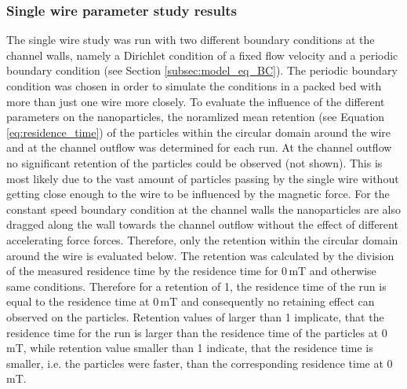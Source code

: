 \subsubsection{Single wire parameter study results}
\label{subsubsec:One_wire}

The single wire study was run with two different boundary conditions at the channel walls, namely a Dirichlet condition of a fixed flow velocity and a periodic boundary condition (see Section \ref{subsec:model_eq_BC}). The periodic boundary condition was chosen in order to simulate the conditions in a packed bed with more than just one wire more closely. To evaluate the influence of the different parameters on the nanoparticles, the noramlized mean retention (see Equation\,\ref{eq:residence_time}) of the particles within the circular domain around the wire and at the channel outflow  was determined for each run. At the channel outflow no significant retention of the particles could be observed (not shown). This is most likely due to the vast amount of particles passing by the single wire without getting close enough to the wire to be influenced by the magnetic force. For the constant speed boundary condition at the channel walls the nanoparticles are also dragged along the wall towards the channel outflow without the effect of different accelerating force forces. Therefore, only the retention within the circular domain around the wire is evaluated below. The retention was calculated by the division of the measured residence time by the residence time for 0\,mT and otherwise same conditions. Therefore for a retention of 1, the residence time of the run is equal to the residence time at 0\,mT and consequently no retaining effect can observed on the particles. Retention values of larger than 1 implicate, that the residence time for the run is larger than the residence time of the particles at 0\,mT, while retention value smaller than 1 indicate, that the residence time is smaller, i.e. the particles were faster, than the corresponding residence time at 0\,mT.  

